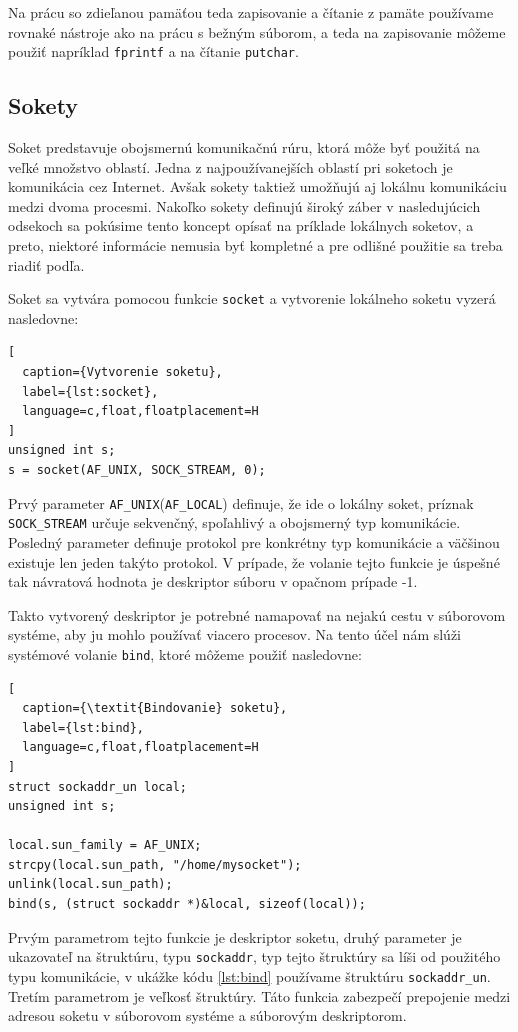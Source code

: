 Na prácu so zdieľanou pamäťou teda zapisovanie a čítanie z pamäte používame rovnaké nástroje ako na prácu s bežným súborom, a teda na zapisovanie môžeme použiť napríklad \texttt{fprintf} a na čítanie \texttt{putchar}.
\subsection{Sokety}
Soket predstavuje obojsmernú komunikačnú rúru, ktorá môže byť použitá na veľké množstvo oblastí. Jedna z najpoužívanejších oblastí pri soketoch je komunikácia cez Internet. Avšak sokety taktiež umožňujú aj lokálnu komunikáciu medzi dvoma procesmi.\cite{beej} Nakoľko sokety definujú široký záber v nasledujúcich odsekoch sa pokúsime tento koncept opísať na príklade lokálnych soketov, a preto, niektoré informácie nemusia byť kompletné a pre odlišné použitie sa treba riadiť podľa\cite{socket}.

Soket sa vytvára pomocou funkcie \texttt{socket} a vytvorenie lokálneho soketu vyzerá nasledovne:
\begin{lstlisting}[
  caption={Vytvorenie soketu},
  label={lst:socket},
  language=c,float,floatplacement=H
]
unsigned int s;
s = socket(AF_UNIX, SOCK_STREAM, 0);
\end{lstlisting}
Prvý parameter \texttt{AF\_UNIX}(\texttt{AF\_LOCAL}) definuje, že ide o lokálny soket, príznak \texttt{SOCK\_STREAM} určuje sekvenčný, spoľahlivý a obojsmerný typ komunikácie. Posledný parameter definuje protokol pre konkrétny typ komunikácie a väčšinou existuje len jeden takýto protokol. V prípade, že volanie tejto funkcie je úspešné tak návratová hodnota je deskriptor súboru v opačnom prípade -1. 

Takto vytvorený deskriptor je potrebné namapovať na nejakú cestu v súborovom systéme, aby ju mohlo používať viacero procesov. Na tento účel nám slúži systémové volanie \texttt{bind}, ktoré môžeme použiť nasledovne:
\begin{lstlisting}[
  caption={\textit{Bindovanie} soketu},
  label={lst:bind},
  language=c,float,floatplacement=H
]
struct sockaddr_un local;
unsigned int s;

local.sun_family = AF_UNIX;
strcpy(local.sun_path, "/home/mysocket");
unlink(local.sun_path);
bind(s, (struct sockaddr *)&local, sizeof(local));
\end{lstlisting}
Prvým parametrom tejto funkcie je deskriptor soketu, druhý parameter je ukazovateľ na štruktúru, typu \texttt{sockaddr}, typ tejto štruktúry sa líši od použitého typu komunikácie, v ukážke kódu \ref{lst:bind} používame štruktúru \texttt{sockaddr\_un}. Tretím parametrom je veľkosť štruktúry. Táto funkcia zabezpečí prepojenie medzi adresou soketu v súborovom systéme a súborovým deskriptorom.

